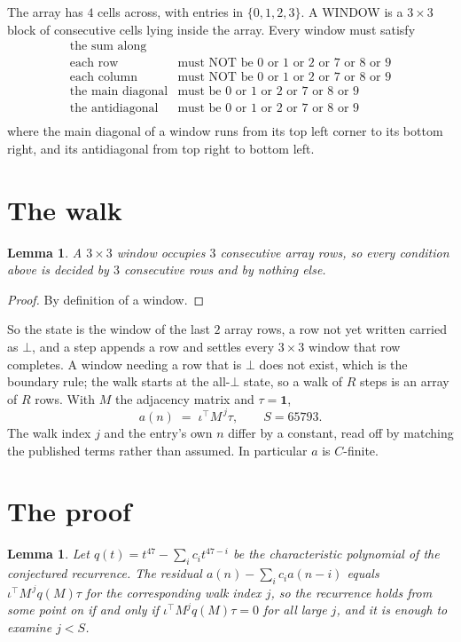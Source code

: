 \documentclass[11pt,a4paper]{article}
\theoremstyle{plain}
\newtheorem{lemma}[theorem]{Lemma}
\theoremstyle{definition}
\begin{document}
The array has $4$ cells across, with entries in $\{0,1,2,3\}$. A WINDOW is a $3\times3$ block
of consecutive cells lying inside the array. Every window must satisfy
\[
\begin{array}{ll}
\text{the sum along} & \text{} \\[2pt]
\text{each row} & \text{must NOT be 0 or 1 or 2 or 7 or 8 or 9} \\
\text{each column} & \text{must NOT be 0 or 1 or 2 or 7 or 8 or 9} \\
\text{the main diagonal} & \text{must be 0 or 1 or 2 or 7 or 8 or 9} \\
\text{the antidiagonal} & \text{must be 0 or 1 or 2 or 7 or 8 or 9} \\
\end{array}
\]
where the main diagonal of a window runs from its top left corner to its bottom right, and its
antidiagonal from top right to bottom left.

\section{The walk}

\begin{lemma}\label{lem:win}
A $3\times3$ window occupies $3$ consecutive array rows, so every condition above is
decided by $3$ consecutive rows and by nothing else.
\end{lemma}

\begin{proof}
By definition of a window.
\end{proof}

So the state is the window of the last $2$ array rows, a row not yet written carried as
$\bot$, and a step appends a row and settles every $3\times3$ window that row completes. A
window needing a row that is $\bot$ does not exist, which is the boundary rule; the walk starts
at the all-$\bot$ state, so a walk of $R$ steps is an array of $R$ rows. With $M$ the adjacency
matrix and $\tau=\mathbf{1}$,
\[
a(n)\;=\;\iota^{\!\top}M^{\,j}\tau ,\qquad S=65793.
\]
The walk index $j$ and the entry's own $n$ differ by a constant, read off by matching the
published terms rather than assumed. In particular $a$ is $C$-finite.

\section{The proof}

\begin{lemma}\label{lem:crit}
Let $q(t)=t^{47}-\sum_i c_it^{47-i}$ be the characteristic polynomial of the
conjectured recurrence. The residual $a(n)-\sum_ic_ia(n-i)$ equals
$\iota^{\!\top}M^{\,j}q(M)\tau$ for the corresponding walk index $j$, so the recurrence
holds from some point on if and only if $\iota^{\!\top}M^{j}q(M)\tau=0$ for all large $j$,
and it is enough to examine $j<S$.
\end{lemma}
\end{document}
